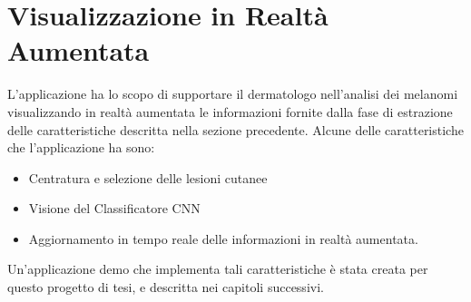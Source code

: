 \section{Visualizzazione in Realtà Aumentata}
L'applicazione ha lo scopo di supportare il dermatologo nell'analisi dei melanomi visualizzando in realtà aumentata le informazioni fornite dalla fase di estrazione delle caratteristiche descritta nella sezione precedente.\cite{francese2020}
Alcune delle caratteristiche che l'applicazione ha sono:
\begin{itemize}
	\item Centratura e selezione delle lesioni cutanee
	\item Visione del Classificatore CNN
	\item Aggiornamento in tempo reale delle informazioni in realtà aumentata.
\end{itemize}
Un'applicazione demo che implementa tali caratteristiche è stata creata per questo progetto di tesi, e descritta nei capitoli successivi.
